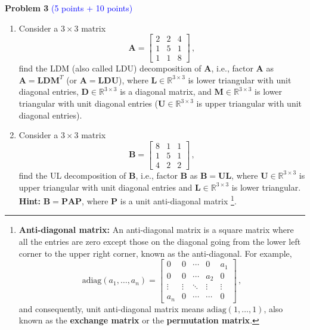 \documentclass[english,onecolumn]{IEEEtran}
\begin{document}
\newpage
\noindent\textbf{Problem 3} \textcolor{blue}{(5 points + 10 points)}
\begin{enumerate}
	\item Consider a $3\times 3$ matrix 
	\[
	\mathbf{A} = \begin{bmatrix}
		2& 2&4 \\
		1&5&1\\
		1&1&8
	\end{bmatrix}\,,
	\] find the LDM (also called LDU) decomposition of $\mathbf{A}$, i.e., factor $\mathbf{A}$ as $\mathbf{A}=\mathbf{L}\mathbf{D}\mathbf{M}^T$ (or $\mathbf{A}=\mathbf{L}\mathbf{D}\mathbf{U}$), where $\mathbf{L}\in\mathbb{R}^{3\times 3}$ is lower triangular with unit diagonal entries, $\mathbf{D}\in\mathbb{R}^{3\times 3}$  is  a diagonal matrix, and $\mathbf{M}\in\mathbb{R}^{3\times 3}$ is lower triangular with unit diagonal entries ($\mathbf{U}\in\mathbb{R}^{3\times 3}$ is upper triangular with unit diagonal entries).
	
	\item Consider a $3\times 3$ matrix
	\[
	\mathbf{B} = \begin{bmatrix}
		8& 1&1 \\
		1&5&1\\
		4&2&2
	\end{bmatrix}\,,
	\] find the UL decomposition  of $\mathbf{B}$, 
	i.e., factor $\mathbf{B}$ as $\mathbf{B} = \mathbf{UL}$,
	where $\mathbf{U}\in\mathbb{R}^{3\times 3}$ is upper triangular with unit diagonal entries and $\mathbf{L}\in\mathbb{R}^{3\times 3}$ is lower triangular.\\
	\textbf{Hint:}  $\mathbf{B}=\mathbf{P}\mathbf{A}\mathbf{P}$, where $\mathbf{P}$ is a unit anti-diagonal matrix \footnote{{\textbf{Anti-diagonal matrix:} An anti-diagonal matrix is a square matrix where all the entries are zero except those on the diagonal going from the lower left corner to the upper right corner, known as the anti-diagonal. For example, 
			\[
			\text{adiag}(a_1,\ldots,a_n) = \begin{bmatrix}
				0 & 0 & \cdots & 0 & a_1 \\
				0 & 0 & \cdots  & a_2 & 0 \\
				\vdots &  \vdots & \ddots & \vdots &\vdots \\
				a_n & 0 & \cdots &  \cdots& 0
			\end{bmatrix}\,,
			\]
			and consequently, unit anti-diagonal matrix means $\text{adiag}(1,\ldots,1)$, also known as the \textbf{exchange matrix} or the \textbf{permutation matrix}. 
	}}.
\end{enumerate}
\end{document}
